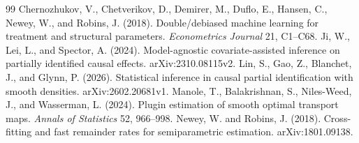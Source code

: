\documentclass[11pt]{article}
\begin{document}
\begin{thebibliography}{99}
 Chernozhukov, V., Chetverikov, D., Demirer, M., Duflo, E., Hansen, C., Newey, W., and Robins, J. (2018). Double/debiased machine learning for treatment and structural parameters. \emph{Econometrics Journal} 21, C1--C68.
 Ji, W., Lei, L., and Spector, A. (2024). Model-agnostic covariate-assisted inference on partially identified causal effects. arXiv:2310.08115v2.
 Lin, S., Gao, Z., Blanchet, J., and Glynn, P. (2026). Statistical inference in causal partial identification with smooth densities. arXiv:2602.20681v1.
 Manole, T., Balakrishnan, S., Niles-Weed, J., and Wasserman, L. (2024). Plugin estimation of smooth optimal transport maps. \emph{Annals of Statistics} 52, 966--998.
 Newey, W. and Robins, J. (2018). Cross-fitting and fast remainder rates for semiparametric estimation. arXiv:1801.09138.
\end{thebibliography}
\end{document}
